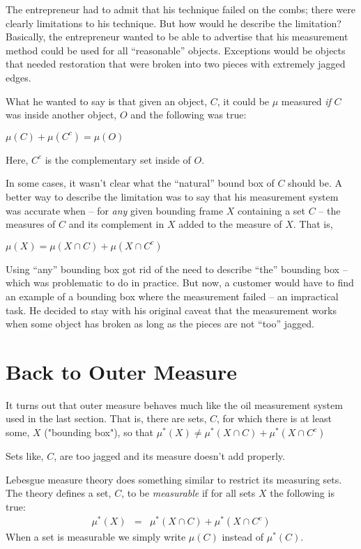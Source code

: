 \documentclass{article}
\begin{document}
The entrepreneur had to admit that his technique failed on the combs; 
there were clearly limitations to his technique. 
But how would he describe the limitation? Basically, the entrepreneur wanted to 
be able to advertise that his measurement method could be used for all 
``reasonable'' objects. Exceptions would be objects that needed restoration 
that were broken into two pieces with extremely jagged edges.

What he wanted to say is that given an object, $C$, it could be $\mu$ measured 
{\em if\/} $C$ was inside another object, $O$ and the following was true:

$\mu(C) + \mu(C^c) = \mu(O)$

Here, $C^c$ is the complementary set inside of $O$.

In some cases, it wasn't clear what the ``natural'' bound box of $C$ should be. A better way 
to describe the limitation was to say that his measurement system was accurate 
when -- for {\em any\/} given bounding frame $X$ containing a set $C$ -- 
the measures of $C$ and 
its complement in $X$ added to the measure of $X$. That is,

$\mu(X) = \mu(X \cap C) + \mu(X \cap C^c)$

Using ``any'' bounding box got rid of the need to describe ``the'' bounding box -- which
was problematic to do in practice.
But now, a customer would have to find an example of a bounding box where the 
measurement failed -- an impractical task.
He decided to stay with his original caveat that the measurement works when some object has 
broken as long as the pieces are not ``too'' jagged.


\section{Back to Outer Measure}
It turns out that outer measure behaves much like the oil measurement system 
used in the last section. That is, there are sets, $C$, for which there is at 
least some, $X$ ("bounding box"), so that
$\mu^*(X) \neq \mu^*(X \cap C) + \mu^*(X \cap C^c)$

Sets like, $C$, are too jagged and its measure doesn't add properly.

Lebesgue measure theory does something similar to restrict its measuring sets.
The theory defines a set, $C$, to be {\em measurable\/}
if for all sets $X$ the following is true:
\begin{eqnarray}
	\mu^*(X) & = & \mu^*(X \cap C) + \mu^*(X \cap C^c) \label{Carthy}
\end{eqnarray}
When a set is measurable we simply write $\mu(C)$ instead of $\mu^*(C)$.
\end{document}

